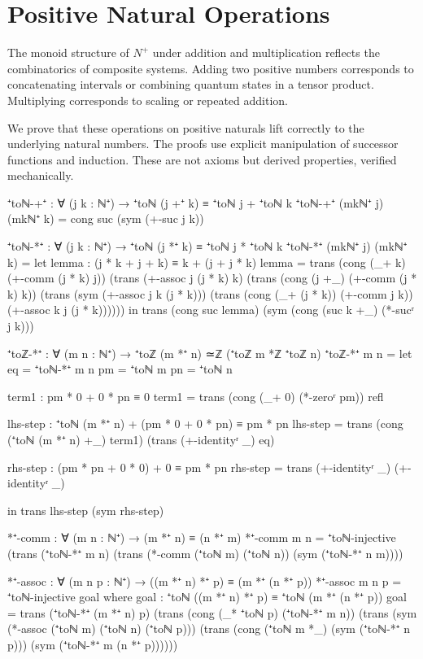 \documentclass[11pt,a4paper]{book}
\def\mathbb#1{#1}%
\begin{document}
\section{Positive Natural Operations}

The monoid structure of $\mathbb{N}^+$ under addition and multiplication reflects the combinatorics of composite systems.
Adding two positive numbers corresponds to concatenating intervals or combining quantum states in a tensor product.
Multiplying corresponds to scaling or repeated addition.

We prove that these operations on positive naturals lift correctly to the underlying natural numbers.
The proofs use explicit manipulation of successor functions and induction.
These are not axioms but derived properties, verified mechanically.

\begin{code}
⁺toℕ-+⁺ : ∀ (j k : ℕ⁺) → ⁺toℕ (j +⁺ k) ≡ ⁺toℕ j + ⁺toℕ k
⁺toℕ-+⁺ (mkℕ⁺ j) (mkℕ⁺ k) = cong suc (sym (+-suc j k))

⁺toℕ-*⁺ : ∀ (j k : ℕ⁺) → ⁺toℕ (j *⁺ k) ≡ ⁺toℕ j * ⁺toℕ k
⁺toℕ-*⁺ (mkℕ⁺ j) (mkℕ⁺ k) = 
  let
    lemma : (j * k + j + k) ≡ k + (j + j * k)
    lemma = trans (cong (_+ k) (+-comm (j * k) j))
            (trans (+-assoc j (j * k) k)
            (trans (cong (j +_) (+-comm (j * k) k))
            (trans (sym (+-assoc j k (j * k)))
            (trans (cong (_+ (j * k)) (+-comm j k))
            (+-assoc k j (j * k))))))
  in trans (cong suc lemma) (sym (cong (suc k +_) (*-sucʳ j k)))

⁺toℤ-*⁺ : ∀ (m n : ℕ⁺) → ⁺toℤ (m *⁺ n) ≃ℤ (⁺toℤ m *ℤ ⁺toℤ n)
⁺toℤ-*⁺ m n = 
  let eq = ⁺toℕ-*⁺ m n
      pm = ⁺toℕ m
      pn = ⁺toℕ n
      
      term1 : pm * 0 + 0 * pn ≡ 0
      term1 = trans (cong (_+ 0) (*-zeroʳ pm)) refl
      
      lhs-step : ⁺toℕ (m *⁺ n) + (pm * 0 + 0 * pn) ≡ pm * pn
      lhs-step = trans (cong (⁺toℕ (m *⁺ n) +_) term1) 
                       (trans (+-identityʳ _) eq)
                       
      rhs-step : (pm * pn + 0 * 0) + 0 ≡ pm * pn
      rhs-step = trans (+-identityʳ _) (+-identityʳ _)
      
  in trans lhs-step (sym rhs-step)


*⁺-comm : ∀ (m n : ℕ⁺) → (m *⁺ n) ≡ (n *⁺ m)
*⁺-comm m n = ⁺toℕ-injective (trans (⁺toℕ-*⁺ m n) (trans (*-comm (⁺toℕ m) (⁺toℕ n)) (sym (⁺toℕ-*⁺ n m))))

*⁺-assoc : ∀ (m n p : ℕ⁺) → ((m *⁺ n) *⁺ p) ≡ (m *⁺ (n *⁺ p))
*⁺-assoc m n p = ⁺toℕ-injective goal
  where
    goal : ⁺toℕ ((m *⁺ n) *⁺ p) ≡ ⁺toℕ (m *⁺ (n *⁺ p))
    goal = trans (⁺toℕ-*⁺ (m *⁺ n) p)
           (trans (cong (_* ⁺toℕ p) (⁺toℕ-*⁺ m n))
           (trans (sym (*-assoc (⁺toℕ m) (⁺toℕ n) (⁺toℕ p)))
           (trans (cong (⁺toℕ m *_) (sym (⁺toℕ-*⁺ n p)))
                  (sym (⁺toℕ-*⁺ m (n *⁺ p))))))
\end{code}
\end{document}
